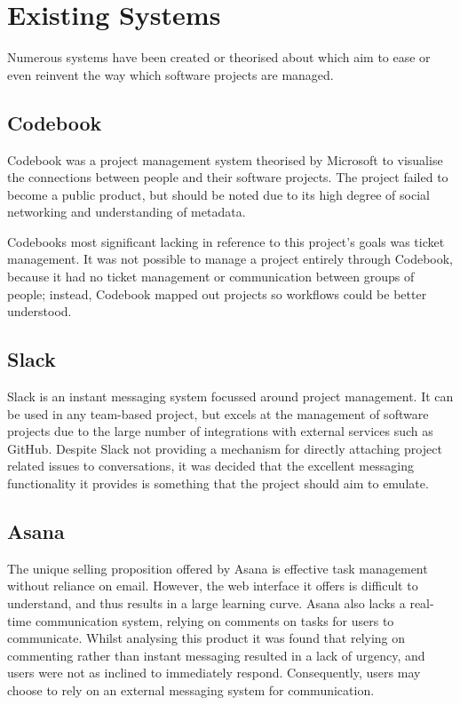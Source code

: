 \documentclass[a4paper]{l3proj}
\begin{document}
\section{Existing Systems}

Numerous systems have been created or theorised about which aim to ease or even reinvent the way which software projects are managed.

\subsection{Codebook}
\label{codebook}
Codebook was a project management system theorised by Microsoft to visualise the connections between people and their software projects. The project failed to become a public product, but should be noted due to its high degree of social networking and understanding of metadata.

Codebooks most significant lacking in reference to this project’s goals was ticket management. It was not possible to manage a project entirely through Codebook, because it had no ticket management or communication between groups of people; instead, Codebook mapped out projects so workflows could be better understood.

\subsection{Slack}
\label{slack}
Slack is an instant messaging system focussed around project management. It can be used in any team-based project, but excels at the management of software projects due to the large number of integrations with external services such as GitHub. Despite Slack not providing a mechanism for directly attaching project related issues to conversations, it was decided that the excellent messaging functionality it provides is something that the project should aim to emulate.

\subsection{Asana}
\label{asana}

The unique selling proposition offered by Asana is effective task management without reliance on email. However, the web interface it offers is difficult to understand, and thus results in a large learning curve. Asana also lacks a real-time communication system, relying on comments on tasks for users to communicate. Whilst analysing this product it was found that relying on commenting rather than instant messaging resulted in a lack of urgency, and users were not as inclined to immediately respond. Consequently, users may choose to rely on an external messaging system for communication.
\end{document}

